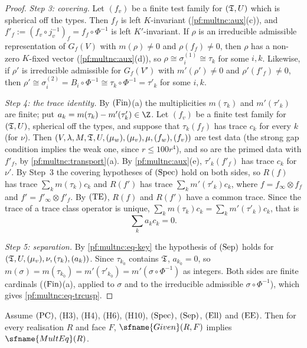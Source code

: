 \begin{proof}
\emph{Step 3: covering.} Let $(f_v)$ be a finite test family for $(\mathfrak{T},U)$ which is spherical off the types. Then
$f_f$ is left $K$-invariant (\cref{pf:multnc:aux}(c)), and $f'_f:=(f_v\circ j_v^{-1})_f=f_f\circ\Phi^{-1}$ is left
$K'$-invariant. If $\rho$ is an irreducible admissible representation of $G_f(V)$ with $m(\rho)\ne0$ and
$\rho(f_f)\ne0$, then $\rho$ has a non-zero $K$-fixed vector (\cref{pf:multnc:aux}(d)), so $\rho\cong\sigma^{(1)}_i\cong
\tau_k$ for some $i,k$. Likewise, if $\rho'$ is irreducible admissible for $G_f(V')$ with $m'(\rho')\ne0$ and
$\rho'(f'_f)\ne0$, then $\rho'\cong\sigma^{(2)}_i=B_i\circ\Phi^{-1}\cong\tau_k\circ\Phi^{-1}=\tau'_k$ for some $i,k$.

\emph{Step 4: the trace identity.} By $\textup{(Fin)}$(a) the multiplicities $m(\tau_k)$ and $m'(\tau'_k)$ are finite; put
$a_k=m(\tau_k)-m'(\tau'_k)\in\Z$. Let $(f_v)$ be a finite test family for $(\mathfrak{T},U)$, spherical off the types, and
suppose that $\tau_k(f_f)$ has trace $c_k$ for every $k$ (for $\nu$). Then
$(V,\lambda,M,\mathfrak{T},U,(\mu_w),(\mu_v),\mu,(f_w),(f_v))$ are test data (the strong gap condition implies the weak one,
since $r\le100r^4$), and so are the primed data with $f'_f$, by \cref{pf:multnc:transport}(a). By \cref{pf:multnc:aux}(e),
$\tau'_k(f'_f)$ has trace $c_k$ for $\nu'$. By Step~3 the covering hypotheses of $\textup{(Spec)}$ hold on both sides, so
$R(f)$ has trace $\sum_km(\tau_k)c_k$ and $R(f')$ has trace $\sum_km'(\tau'_k)c_k$, where $f=f_\infty\otimes f_f$ and
$f'=f'_\infty\otimes f'_f$. By $\textup{(TE)}$, $R(f)$ and $R(f')$ have a common trace. Since the trace of a trace class
operator is unique, $\sum_km(\tau_k)c_k=\sum_km'(\tau'_k)c_k$, that is
\begin{equation}\label{pf:multnc:eq-key}
\sum_ka_kc_k=0.
\end{equation}

\emph{Step 5: separation.} By \eqref{pf:multnc:eq-key} the hypothesis of $\textup{(Sep)}$ holds for
$(\mathfrak{T},U,(\mu_v),\nu,(\tau_k),(a_k))$. Since $\tau_{k_0}$ contains $\mathfrak{T}$, $a_{k_0}=0$, so
$m(\sigma)=m(\tau_{k_0})=m'(\tau'_{k_0})=m'(\sigma\circ\Phi^{-1})$ as integers. Both sides are finite cardinals
($\textup{(Fin)}$(a), applied to $\sigma$ and to the irreducible admissible $\sigma\circ\Phi^{-1}$), which gives
\eqref{pf:multnc:eq-trcusp}.
\end{proof}

\begin{theorem}\label{pf:multnc:multeq-of-sides}
Assume $\textup{(PC)}$, (H3), (H4), (H6), (H10), $\textup{(Spec)}$, $\textup{(Sep)}$, $\textup{(Ell)}$ and
$\textup{(EE)}$. Then for every realisation $R$ and face $F$, $\sfname{Given}(R,F)$ implies $\sfname{MultEq}(R)$.
\end{theorem}

